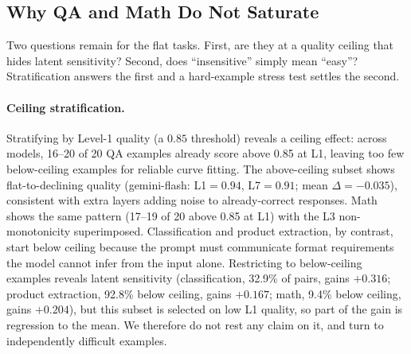 \subsection{Why QA and Math Do Not Saturate}
\label{sec:result-nosat}

Two questions remain for the flat tasks. First, are they at a quality ceiling
that hides latent sensitivity? Second, does ``insensitive'' simply mean ``easy''?
Stratification answers the first and a hard-example stress test settles the
second.

\paragraph{Ceiling stratification.}
Stratifying by Level-1 quality (a $0.85$ threshold) reveals a ceiling effect:
across models, 16--20 of 20 QA examples already score above 0.85 at L1, leaving
too few below-ceiling examples for reliable curve fitting. The above-ceiling
subset shows flat-to-declining quality (gemini-flash: L1$=0.94$, L7$=0.91$; mean
$\Delta = -0.035$), consistent with extra layers adding noise to already-correct
responses. Math shows the same pattern (17--19 of 20 above 0.85 at L1) with the
L3 non-monotonicity superimposed. Classification and product extraction, by
contrast, start below ceiling because the prompt must communicate format
requirements the model cannot infer from the input alone. Restricting to
below-ceiling examples reveals latent sensitivity (classification, 32.9\% of
pairs, gains $+0.316$; product extraction, 92.8\% below ceiling, gains $+0.167$;
math, 9.4\% below ceiling, gains $+0.204$), but this subset is selected on low
L1 quality, so part of the gain is regression to the mean. We therefore do not
rest any claim on it, and turn to independently difficult examples.

